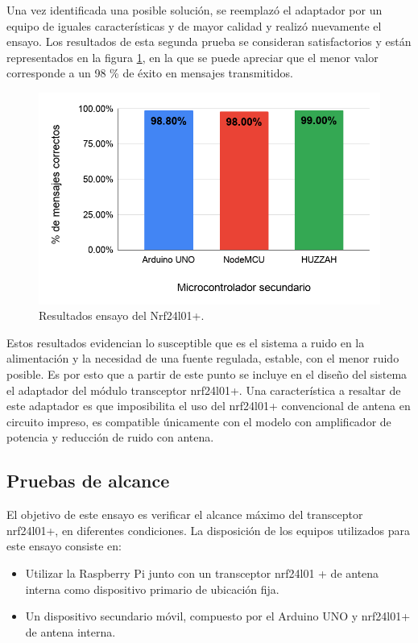 Una vez identificada una posible solución, se reemplazó el adaptador por un equipo de iguales características y de mayor calidad y realizó nuevamente el ensayo. Los resultados de esta segunda prueba se consideran satisfactorios y están representados en la figura \ref{fig:figura_b}, en la que se puede apreciar que el menor valor corresponde a un 98 \% de éxito en mensajes transmitidos.


\begin{figure}[ht]
	\centering
	\includegraphics[scale=.45]{./Figures/Capitulo4/Figura_B.png}
	\caption{Resultados ensayo del Nrf24l01+.}
	\label{fig:figura_b}
\end{figure}

Estos resultados evidencian lo susceptible que es el sistema a ruido en la alimentación y la necesidad de una fuente regulada, estable, con el menor ruido posible. Es por esto que a partir de este punto se incluye en el diseño del sistema el adaptador del módulo transceptor nrf24l01+. Una característica a resaltar de este adaptador es que imposibilita el uso del nrf24l01+ convencional de antena en circuito impreso, es compatible únicamente con el modelo con amplificador de potencia y reducción de ruido con antena.


\subsection{Pruebas de alcance}
 

El objetivo de este ensayo es verificar el alcance máximo del transceptor nrf24l01+, en diferentes condiciones. La disposición de los equipos utilizados para este ensayo consiste en:

\begin{itemize}
\item Utilizar la Raspberry Pi junto con un transceptor nrf24l01 + de antena interna como dispositivo primario de ubicación fija.
\item Un dispositivo secundario móvil, compuesto por el Arduino UNO y nrf24l01+ de antena interna.
\end{itemize}

